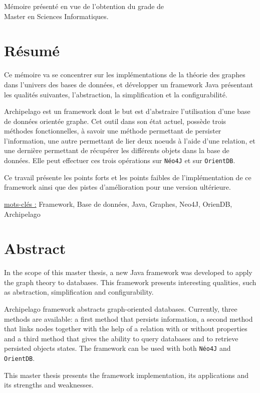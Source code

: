 \documentclass[a4paper,fleqn,12pt]{report}
\begin{document}
\vspace{0.5cm}
\begin{center}
M\'emoire pr\'esent\'e en vue de l'obtention du grade de\\
Master en Sciences Informatiques.
\end{center}

\section*{Résumé}

Ce mémoire va se concentrer sur les implémentations de la théorie des graphes dans l'univers des bases de données, et développer un framework Java présentant les qualités suivantes, l'abstraction, la simplification et la configurabilité. 

Archipelago est un framework dont le but est d'abstraire l'utilisation d'une base de données orientée graphe. Cet outil dans son  état actuel, possède trois méthodes fonctionnelles, à savoir une méthode permettant de persister l'information, une autre permettant de lier deux noeuds à l'aide d'une relation, et une dernière permettant de récupérer les différents objets dans la base de données. Elle peut effectuer ces trois opérations sur \texttt{Néo4J} et sur \texttt{OrientDB}.

Ce travail présente les points forts et les points faibles de l'implémentation de ce framework ainsi que des pistes d'amélioration pour une version ultérieure.

\quad \quad \underline{mots-clés :} Framework, Base de données, Java, Graphes, Neo4J, OrienDB, Archipelago
\section*{Abstract}

In the scope of this master thesis, a new Java framework was developed to apply the graph theory to databases. This framework presents interesting qualities, such as abstraction, simplification and configurability. 

Archipelago framework abstracts graph-oriented databases. Currently, three methods are available: a first method that persists information, a second method that links nodes together with the help of a relation with or without properties and a third method that gives the ability to query databases and to retrieve persisted objects states. The framework can be used with both \texttt{Néo4J} and \texttt{OrientDB}.

This master thesis presents the framework implementation, its applications and its strengths and weaknesses.
\end{document}
